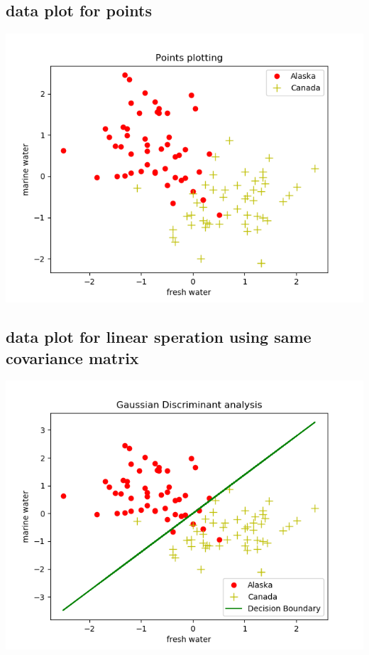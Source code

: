 \documentclass[10pt]{article}
\begin{document}
\subsection{data plot for points}
\begin{center}
\includegraphics[scale=0.8]{pointplot.png} 
\end{center}
\newpage
\subsection{data plot for linear speration using same covariance matrix}
\begin{center}
\includegraphics[scale=0.8]{gline.png} 
\end{center}
\end{document}
